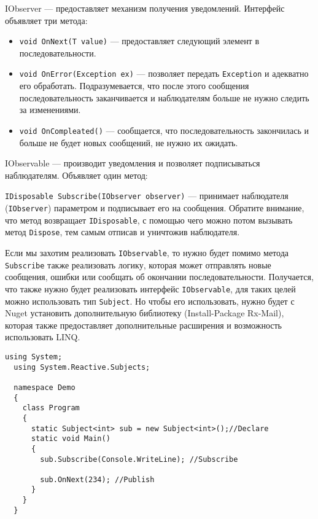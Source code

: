 IObserver --- предоставляет механизм получения уведомлений. Интерфейс объявляет три метода:

\begin{itemize}
  \item \lstinline[style=csharpinlinestyle]!void OnNext(T value)! --- предоставляет следующий элемент в последовательности.
  \item \lstinline[style=csharpinlinestyle]!void OnError(Exception ex)! --- позволяет передать \lstinline[style=csharpinlinestyle]!Exception! и адекватно его обработать. Подразумевается, что после этого сообщения последовательность заканчивается и наблюдателям больше не нужно следить за изменениями.
  \item \lstinline[style=csharpinlinestyle]!void OnCompleated()! --- сообщается, что последовательность закончилась и больше не будет новых сообщений, не нужно их ожидать.
\end{itemize}

IObservable --- производит уведомления и позволяет подписываться наблюдателям. Объявляет один метод:

\lstinline[style=csharpinlinestyle]!IDisposable Subscribe(IObserver observer)! --- принимает наблюдателя (\lstinline[style=csharpinlinestyle]!IObserver!) параметром и подписывает его на сообщения.
Обратите внимание, что метод возвращает \lstinline[style=csharpinlinestyle]!IDisposable!, с помощью чего можно потом вызывать метод \lstinline[style=csharpinlinestyle]!Dispose!, тем самым отписав и уничтожив наблюдателя.

Если мы захотим реализовать \lstinline[style=csharpinlinestyle]!IObservable!, то нужно будет помимо метода \lstinline[style=csharpinlinestyle]!Subscribe! также реализовать логику,
которая может отправлять новые сообщения, ошибки или сообщать об окончании последовательности. Получается, что также нужно будет реализовать интерфейс \lstinline[style=csharpinlinestyle]!IObservable!,
для таких целей можно использовать тип \lstinline[style=csharpinlinestyle]!Subject!. Но чтобы его использовать, нужно будет с Nuget установить дополнительную библиотеку (Install-Package Rx-Mail),
которая также предоставляет дополнительные расширения и возможность использовать LINQ.

\begin{lstlisting}[style=csharpinlinestyle, caption={Пример использования Subject}, label=lst:practice:reactive_extensions:subject_example]
  using System;
  using System.Reactive.Subjects;

  namespace Demo
  {
    class Program
    {
      static Subject<int> sub = new Subject<int>();//Declare
      static void Main()
      {
        sub.Subscribe(Console.WriteLine); //Subscribe

        sub.OnNext(234); //Publish
      }
    }
  }
\end{lstlisting}


